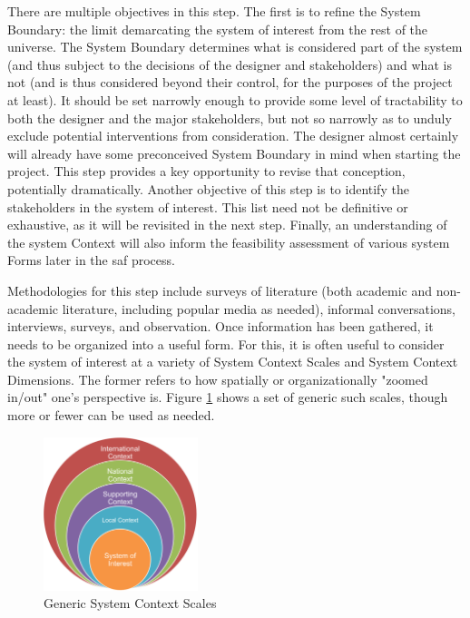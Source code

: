 There are multiple objectives in this step. The first is to refine the System Boundary: the limit demarcating the system of interest from the rest of the universe. The System Boundary determines what is considered part of the system (and thus subject to the decisions of the designer and stakeholders) and what is not (and is thus considered beyond their control, for the purposes of the project at least). It should be set narrowly enough to provide some level of tractability to both the designer and the major stakeholders, but not so narrowly as to unduly exclude potential interventions from consideration. The designer almost certainly will already have some preconceived System Boundary in mind when starting the project. This step provides a key opportunity to revise that conception, potentially dramatically. Another objective of this step is to identify the stakeholders in the system of interest. This list need not be definitive or exhaustive, as it will be revisited in the next step. Finally, an understanding of the system Context will also inform the feasibility assessment of various system Forms later in the \ac{saf} process.

Methodologies for this step include surveys of literature (both academic and non-academic literature, including popular media as needed), informal conversations, interviews, surveys, and observation. Once information has been gathered, it needs to be organized into a useful form. For this, it is often useful to consider the system of interest at a variety of System Context Scales and System Context Dimensions. The former refers to how spatially or organizationally "zoomed in/out" one's perspective is. Figure \ref{fig:scale} shows a set of generic such scales, though more or fewer can be used as needed. 

\begin{figure}[!htb] 
\centering
\includegraphics[width=0.4\textwidth]{Figures/chap3/scale.png}
\caption[Generic System Context Scales]{Generic System Context Scales}
\label{fig:scale}
\end{figure}

